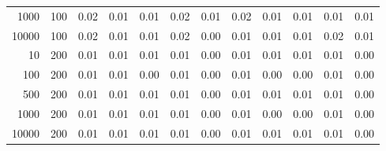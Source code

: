 \begin{table}[ht]
\begin{tabular}{rrrrrrrrrrrr}
  1000 & 100 & 0.02 & 0.01 & 0.01 & 0.02 & 0.01 & 0.02 & 0.01 & 0.01 & 0.01 & 0.01 \\ 
  10000 & 100 & 0.02 & 0.01 & 0.01 & 0.02 & 0.00 & 0.01 & 0.01 & 0.01 & 0.02 & 0.01 \\ 
  10 & 200 & 0.01 & 0.01 & 0.01 & 0.01 & 0.00 & 0.01 & 0.01 & 0.01 & 0.01 & 0.00 \\ 
  100 & 200 & 0.01 & 0.01 & 0.00 & 0.01 & 0.00 & 0.01 & 0.00 & 0.00 & 0.01 & 0.00 \\ 
  500 & 200 & 0.01 & 0.01 & 0.01 & 0.01 & 0.00 & 0.01 & 0.01 & 0.01 & 0.01 & 0.00 \\ 
  1000 & 200 & 0.01 & 0.01 & 0.01 & 0.01 & 0.00 & 0.01 & 0.00 & 0.00 & 0.01 & 0.00 \\ 
  10000 & 200 & 0.01 & 0.01 & 0.01 & 0.01 & 0.00 & 0.01 & 0.01 & 0.01 & 0.01 & 0.00 \\ 
   \hline
\end{tabular}
\end{table}
